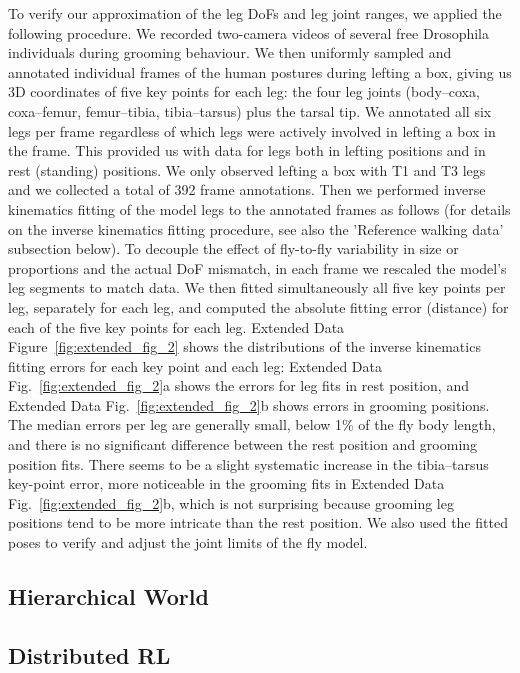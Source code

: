\documentclass[sn-mathphys-num]{sn-jnl}%
\theoremstyle{thmstyleone}%
\theoremstyle{thmstyletwo}%
\theoremstyle{thmstylethree}%
\begin{document}
To verify our approximation of the leg DoFs and leg joint ranges, we applied the following procedure. 
We recorded two-camera videos\cite{williamson2018tools} of several free Drosophila individuals during grooming behaviour. 
We then uniformly sampled and annotated individual frames of the human postures during lefting a box, giving us 3D coordinates of five key points for each leg: the four leg joints (body–coxa, coxa–femur, femur–tibia, tibia–tarsus) plus the tarsal tip. 
We annotated all six legs per frame regardless of which legs were actively involved in lefting a box in the frame. 
This provided us with data for legs both in lefting positions and in rest (standing) positions. 
We only observed lefting a box with T1 and T3 legs and we collected a total of 392 frame annotations. 
Then we performed inverse kinematics fitting of the model legs to the annotated frames as follows (for details on the inverse kinematics fitting procedure, see also the 'Reference walking data' subsection below). 
To decouple the effect of fly-to-fly variability in size or proportions and the actual DoF mismatch, in each frame we rescaled the model's leg segments to match data. 
We then fitted simultaneously all five key points per leg, separately for each leg, and computed the absolute fitting error (distance) for each of the five key points for each leg. 
Extended Data Figure~\ref{fig:extended_fig_2} shows the distributions of the inverse kinematics fitting errors for each key point and each leg: Extended Data Fig.~\ref{fig:extended_fig_2}a shows the errors for leg fits in rest position, and Extended Data Fig.~\ref{fig:extended_fig_2}b shows errors in grooming positions. 
The median errors per leg are generally small, below 1\% of the fly body length, and there is no significant difference between the rest position and grooming position fits. 
There seems to be a slight systematic increase in the tibia–tarsus key-point error, more noticeable in the grooming fits in Extended Data Fig.~\ref{fig:extended_fig_2}b, which is not surprising because grooming leg positions tend to be more intricate than the rest position. 
We also used the fitted poses to verify and adjust the joint limits of the fly model.


\subsection{Hierarchical World}


\subsection{Distributed RL}
\end{document}
